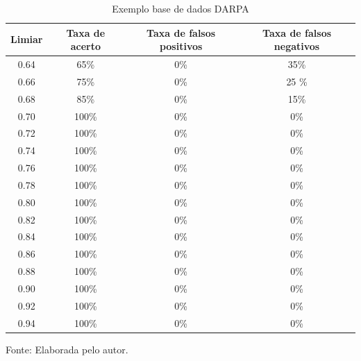   \begin{table}[htb]
  	\centering
  	\begin{threeparttable}
  		\caption{Exemplo base de dados DARPA}
  		\label{Tab:ResultsDARPA}
  		\begin{tabular}{c c c c}
  			\toprule
  			\textbf{Limiar} & \textbf{Taxa de acerto} & \textbf{Taxa de falsos positivos} & \textbf{Taxa de falsos negativos}
  			\\ \midrule
  			0.64 &  65\% &  0\%& 35\%   \\ \midrule
  			0.66 &  75\% & 0\% & 25 \%   \\ \midrule
  			0.68 &  85\%  & 0\% & 15\%   \\ \midrule
  			0.70 &  100\%  &  0\% & 0\%   \\ \midrule
  			0.72 &  100\%  &  0\% & 0\%     \\ \midrule
  			0.74 &  100\%  & 0\% & 0\%    \\ \midrule
  			0.76 &  100\%  &  0\% & 0\%   \\ \midrule
  			0.78 &  100\%  &  0\% & 0\%   \\ \midrule
  			0.80 &  100\%  &  0\% & 0\%   \\ \midrule
  			0.82 &  100\%  &  0\% & 0\%   \\ \midrule
  			0.84 &  100\%  &  0\% & 0\%   \\ \midrule
  			0.86 &  100\%  &  0\% & 0\%   \\ \midrule
  			0.88 &  100\%  &  0\% & 0\%   \\ \midrule
  			0.90 &  100\%  &  0\% & 0\%   \\ \midrule
  			0.92 &  100\%  &  0\% & 0\%   \\ \midrule
   			0.94 &  100\%  & 0\% & 0\%   \\ \bottomrule
  		\end{tabular}
  		{Fonte: Elaborada pelo autor.}
  	\end{threeparttable}
  \end{table}

